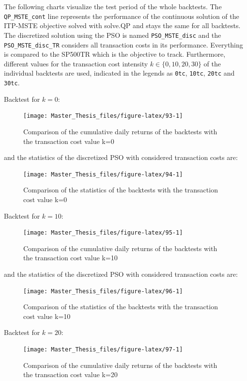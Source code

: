 \documentclass[
  oneside, a4paper, 12pt, openany]{book}
\theoremstyle{definition}
\theoremstyle{definition}
\theoremstyle{definition}
\theoremstyle{definition}
\theoremstyle{remark}
\begin{document}
The following charts visualize the test period of the whole backtests. The \texttt{QP\_MSTE\_cont} line represents the performance of the continuous solution of the ITP-MSTE objective solved with solve.QP and stays the same for all backtests. The discretized solution using the PSO is named \texttt{PSO\_MSTE\_disc} and the \texttt{PSO\_MSTE\_disc\_TR} considers all transaction costs in its performance. Everything is compared to the SP500TR which is the objective to track. Furthermore, different values for the transaction cost intensity \(k \in \{0, 10, 20, 30\}\) of the individual backtests are used, indicated in the legends as \texttt{0tc}, \texttt{10tc}, \texttt{20tc} and \texttt{30tc}.

Backtest for \(k=0\):

\begin{figure}[H]
\texttt{[image: Master\_Thesis\_files/figure-latex/93-1]} \caption{Comparison of the cumulative daily returns of the backtests with the transaction cost value k=0}\label{fig:93}
\end{figure}

and the statistics of the discretized PSO with considered transaction costs are:

\begin{figure}[H]
\texttt{[image: Master\_Thesis\_files/figure-latex/94-1]} \caption{Comparison of the statistics of the backtests with the transaction cost value k=0}\label{fig:94}
\end{figure}

Backtest for \(k=10\):

\begin{figure}[H]
\texttt{[image: Master\_Thesis\_files/figure-latex/95-1]} \caption{Comparison of the cumulative daily returns of the backtests with the transaction cost value k=10}\label{fig:95}
\end{figure}

and the statistics of the discretized PSO with considered transaction costs are:

\begin{figure}[H]
\texttt{[image: Master\_Thesis\_files/figure-latex/96-1]} \caption{Comparison of the statistics of the backtests with the transaction cost value k=10}\label{fig:96}
\end{figure}

Backtest for \(k=20\):

\begin{figure}[H]
\texttt{[image: Master\_Thesis\_files/figure-latex/97-1]} \caption{Comparison of the cumulative daily returns of the backtests with the transaction cost value k=20}\label{fig:97}
\end{figure}
\end{document}
